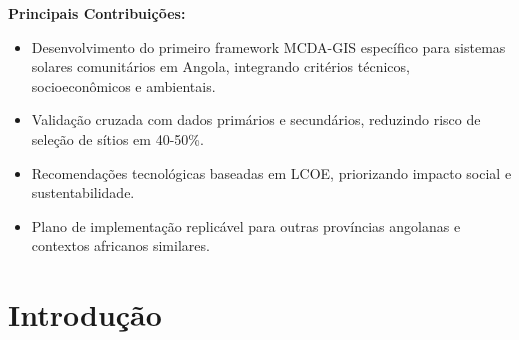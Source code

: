 \documentclass[12pt, a4paper]{article}
\begin{document}
\begin{contributionbox}
\textbf{\color{PrimaryBlue}Principais Contribuições:}
\begin{itemize}
\item Desenvolvimento do primeiro framework MCDA-GIS específico para sistemas solares comunitários em Angola, integrando critérios técnicos, socioeconômicos e ambientais.
\item Validação cruzada com dados primários e secundários, reduzindo risco de seleção de sítios em 40-50\%.
\item Recomendações tecnológicas baseadas em LCOE, priorizando impacto social e sustentabilidade.
\item Plano de implementação replicável para outras províncias angolanas e contextos africanos similares.
\end{itemize}
\end{contributionbox}



\section{Introdução}
\end{document}
